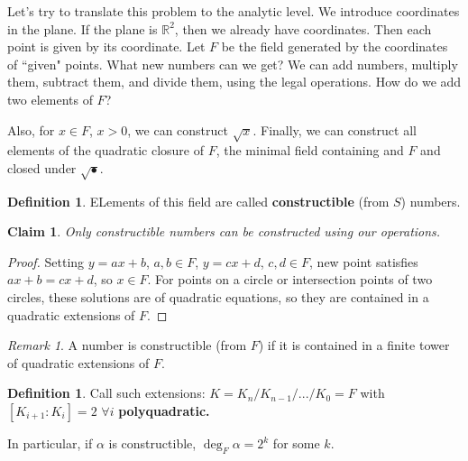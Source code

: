 \documentclass[9pt,reqno,twoside]{amsbook}
\theoremstyle{plain}
\newtheorem*{Claim}{Claim}
\numberwithin{section}{chapter}
\numberwithin{equation}{chapter}
\theoremstyle{definition}
\newtheorem{Def}[theorem]{Definition}
\theoremstyle{remark}
\newtheorem{rem}[theorem]{Remark}
\theoremstyle{plain}
\newcommand{\R}{\mathbb{R}}
\begin{document}
Let's try to translate this problem to the analytic level. We introduce coordinates in the plane. If the plane is $\R^2$, then we already have coordinates. Then each point is given by its coordinate. Let $F$ be the field generated by the coordinates of ``given" points. What new numbers can we get? We can add numbers, multiply them, subtract them, and divide them, using the legal operations. How do we add two elements of $F$?

Also, for $x \in F$, $x > 0$, we can construct $\sqrt{x}$. Finally, we can construct all elements of the quadratic closure of $F$, the minimal field containing and $F$ and closed under $\sqrt{•}$. 

\begin{Def}
ELements of this field are called \textbf{constructible} (from $S$) numbers. 
\end{Def}


\begin{Claim}
Only constructible numbers can be constructed using our operations. 
\end{Claim}

\begin{proof}
Setting $y = ax + b$, $a,b \in F$, $y = cx + d$, $c,d \in F$, new point satisfies $ax + b = cx + d$, so $x \in F$. For points on a circle or intersection points of two circles, these solutions are of quadratic equations, so they are contained in a quadratic extensions of $F$. 
\end{proof}

\begin{rem}
A number is constructible (from $F$) if it is contained in a finite tower of quadratic extensions of $F$. 
\end{rem}

\begin{Def}
Call such extensions: $K = K_n/K_{n - 1}/.../K_0 = F$ with $[K_{i + 1}:K_i] = 2$ $\forall i$ \textbf{polyquadratic. }
\end{Def}

In particular, if $\alpha$ is constructible, $\deg_F \alpha = 2^k$ for some $k$. 
\end{document}
